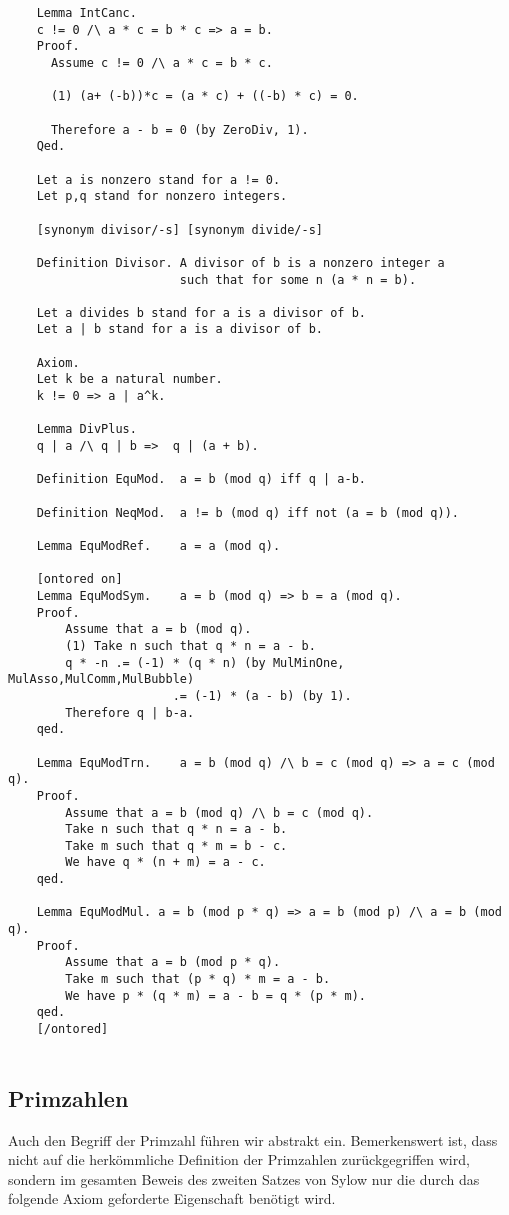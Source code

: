 \documentclass[a4paper,12pt]{scrartcl}
\begin{document}
\begin{lstlisting}
	Lemma IntCanc.
	c != 0 /\ a * c = b * c => a = b.
	Proof.
	  Assume c != 0 /\ a * c = b * c.
	  
	  (1) (a+ (-b))*c = (a * c) + ((-b) * c) = 0.
	  
	  Therefore a - b = 0 (by ZeroDiv, 1).
	Qed.
	
	Let a is nonzero stand for a != 0.
	Let p,q stand for nonzero integers.
	
	[synonym divisor/-s] [synonym divide/-s]
	
	Definition Divisor. A divisor of b is a nonzero integer a
						such that for some n (a * n = b).
	
	Let a divides b stand for a is a divisor of b.
    Let a | b stand for a is a divisor of b.
    
    Axiom.
	Let k be a natural number.
	k != 0 => a | a^k.
	
	Lemma DivPlus.
	q | a /\ q | b =>  q | (a + b).
	
	Definition EquMod.  a = b (mod q) iff q | a-b.
	
	Definition NeqMod.  a != b (mod q) iff not (a = b (mod q)).
	
	Lemma EquModRef.    a = a (mod q).
	
	[ontored on]
	Lemma EquModSym.    a = b (mod q) => b = a (mod q).
	Proof.
		Assume that a = b (mod q).
		(1) Take n such that q * n = a - b.
		q * -n .= (-1) * (q * n) (by MulMinOne, MulAsso,MulComm,MulBubble)
					   .= (-1) * (a - b) (by 1).
		Therefore q | b-a.
	qed.
	
	Lemma EquModTrn.    a = b (mod q) /\ b = c (mod q) => a = c (mod q).
	Proof.
		Assume that a = b (mod q) /\ b = c (mod q).
		Take n such that q * n = a - b.
		Take m such that q * m = b - c.
		We have q * (n + m) = a - c.
	qed.
	
	Lemma EquModMul. a = b (mod p * q) => a = b (mod p) /\ a = b (mod q).
	Proof.
		Assume that a = b (mod p * q).
		Take m such that (p * q) * m = a - b.
		We have p * (q * m) = a - b = q * (p * m).
	qed.
	[/ontored]
	
\end{lstlisting}

\subsection{Primzahlen}

Auch den Begriff der Primzahl führen wir abstrakt ein. Bemerkenswert ist, dass nicht auf die herkömmliche Definition der Primzahlen zurückgegriffen wird, sondern im gesamten Beweis des zweiten Satzes von Sylow nur die durch das folgende Axiom geforderte Eigenschaft benötigt wird.
\end{document}
